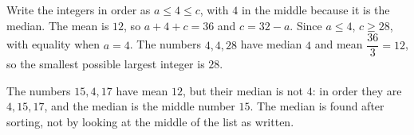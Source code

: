 Write the integers in order as $a\le4\le c$, with $4$ in the middle because it is the median. The mean is $12$, so $a+4+c=36$ and $c=32-a$. Since $a\le4$, $c\ge28$, with equality when $a=4$. The numbers $4,4,28$ have median $4$ and mean $\dfrac{36}{3}=12$, so the smallest possible largest integer is $\boxed{28}$.

The numbers $15,4,17$ have mean $12$, but their median is not $4$: in order they are $4,15,17$, and the median is the middle number $15$. The median is found after sorting, not by looking at the middle of the list as written.
